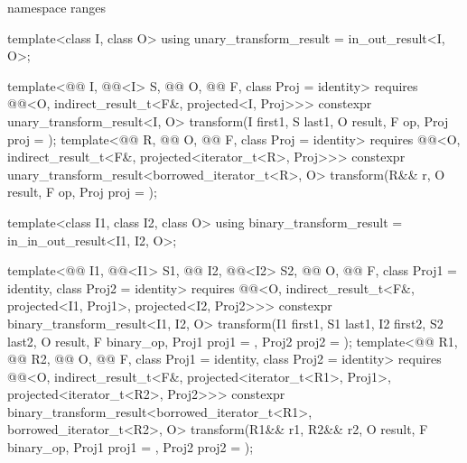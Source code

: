 \begin{codeblock}
{  namespace ranges {
    template<class I, class O>
      using unary_transform_result = in_out_result<I, O>;

    template<@@ I, @@<I> S, @@ O,
             @@ F, class Proj = identity>
      requires @@<O, indirect_result_t<F&, projected<I, Proj>>>
      constexpr unary_transform_result<I, O>
        transform(I first1, S last1, O result, F op, Proj proj = {});
    template<@@ R, @@ O, @@ F,
             class Proj = identity>
      requires @@<O, indirect_result_t<F&, projected<iterator_t<R>, Proj>>>
      constexpr unary_transform_result<borrowed_iterator_t<R>, O>
        transform(R&& r, O result, F op, Proj proj = {});

    template<class I1, class I2, class O>
      using binary_transform_result = in_in_out_result<I1, I2, O>;

    template<@@ I1, @@<I1> S1, @@ I2, @@<I2> S2,
             @@ O, @@ F, class Proj1 = identity,
             class Proj2 = identity>
      requires @@<O, indirect_result_t<F&, projected<I1, Proj1>,
                                             projected<I2, Proj2>>>
      constexpr binary_transform_result<I1, I2, O>
        transform(I1 first1, S1 last1, I2 first2, S2 last2, O result,
                  F binary_op, Proj1 proj1 = {}, Proj2 proj2 = {});
    template<@@ R1, @@ R2, @@ O,
             @@ F, class Proj1 = identity, class Proj2 = identity>
      requires @@<O, indirect_result_t<F&, projected<iterator_t<R1>, Proj1>,
                                             projected<iterator_t<R2>, Proj2>>>
      constexpr binary_transform_result<borrowed_iterator_t<R1>, borrowed_iterator_t<R2>, O>
        transform(R1&& r1, R2&& r2, O result,
                  F binary_op, Proj1 proj1 = {}, Proj2 proj2 = {});
  }

}
\end{codeblock}
